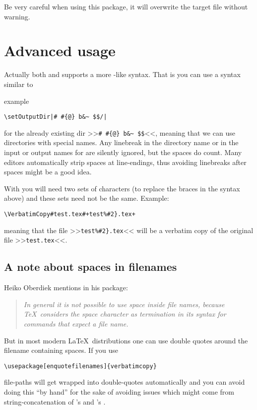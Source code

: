 \documentclass[11pt,a4paper,oldfontcommands,danish,english,article,oneside]{memoir}
\begin{document}
Be very careful when using this package, it will overwrite the target
file without warning.

\section{Advanced usage}
\label{sec:advanced-usage}



Actually both  and
 supports a more -like
syntax. That is you can use a syntax similar to
\begin{syntax}
\end{syntax}
example
\begin{syntax}
  \verb+\setOutputDir|# #{@} b&~ $$/|+
\end{syntax}
for the already existing dir >>\verb+# #{@} b&~ $$+<<, meaning
that we can use directories with special names. Any linebreak in
the directory name or in the input or output names for
 are silently ignored, but the spaces
do count. Many editors automatically strip spaces at
line-endings, thus avoiding linebreaks after spaces might be a
good idea.

With  you will need two sets of 
characters (to replace the braces in the syntax above) and these sets
need not be the same. Example:
\begin{syntax}
  \verb|\VerbatimCopy#test.tex#+test%#2}.tex+|
\end{syntax}
meaning that the file >>\texttt{test\%\#2\}.tex}<< will be a
verbatim copy of the original file >>\texttt{test.tex}<<.

\subsection{A note about spaces in filenames}
\label{sec:note-about-spaces}

Heiko Oberdiek mentions in his   package:
\begin{quote}\itshape
  In general it is not possible to use space inside file names,
  because \TeX\ considers the space character as termination in its
  syntax for commands that expect a file name.
\end{quote}
But in most modern \LaTeX\ distributions one can use double
quotes around the filename containing spaces. If you use
\begin{syntax}
  \verb+\usepackage[enquotefilenames]{verbatimcopy}+
\end{syntax}
file-paths will get wrapped into double-quotes automatically
and you can avoid doing this ``by hand'' for the sake of avoiding
issues which might come from string-concatenation of
's  and
's .
\end{document}
